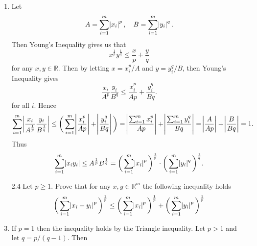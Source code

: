 \documentclass[12pt]{article}
\makeatletter
\theoremstyle{definition}
\theoremstyle{remark}
\renewenvironment{proof}[1][\proofname]{\par
  \pushQED{\qed}%
  \normalfont \topsep6\p@\@plus6\p@\relax
  \list{}{\leftmargin=0mm
          \rightmargin=4mm
          \settowidth{\itemindent}{\itshape#1}%
          \labelwidth=\itemindent
          \parsep=0pt \listparindent=\parindent 
  }
  \item[\hskip\labelsep
        \itshape
    #1\@addpunct{.}]\ignorespaces
}{%
  \popQED\endlist\@endpefalse
}
\let\oldproofname=\proofname
\renewcommand{\proofname}{\bf{\textit{\oldproofname}}}
\makeatother
\begin{document}
\begin{enumerate}[leftmargin=*]
            \begin{proof}
                Let 
                    \begin{equation*}
                        A=\sum_{i=1}^m\abs{x_i}^p,\quad B=\sum_{i=1}^m\abs{y_i}^q.
                    \end{equation*}
                Then Young's Inequality gives us that 
                    \begin{equation*}
                        x^{\frac{1}{p}}y^{\frac{1}{q}}\leq\frac{x}{p}+\frac{y}{q}
                    \end{equation*}
                for any $x,y\in\mathbb{R}$. Then by letting $x=x_i^p/A$ and $y=y_i^q/B$, then Young's Inequality gives 
                    \begin{equation*}
                        \frac{x_i}{A^p}\frac{y_i}{B^q}\leq \frac{x_i^p}{Ap}+\frac{y_i^q}{Bq}.
                    \end{equation*}
                for all $i$. Hence 
                    \begin{equation*}
                        \begin{split}
                            \sum_{i=1}^{m}\abs{\frac{x_i}{A^{\frac{1}{p}}}\frac{y_i}{B^{\frac{1}{q}}}}\leq \bigg(\sum_{i=1}^{m}\abs{\frac{x_i^p}{Ap}}+\abs{\frac{y_i^q}{Bq}}\bigg)=\abs{\frac{\sum_{i=1}^{m}x_i^p}{Ap}}+\abs{\frac{\sum_{i=1}^{m}y_i^q}{Bq}}=\abs{\frac{A}{Ap}}+\abs{\frac{B}{Bq}}=1.
                        \end{split}
                    \end{equation*}
                Thus 
                    \begin{equation*}
                        \sum_{i=1}^{m}\abs{x_iy_i}\leq A^{\frac{1}{p}}B^{\frac{1}{q}}=\bigg(\sum_{i=1}^{m}\abs{x_i}^p\bigg)^{\frac{1}{p}}\cdot\bigg(\sum_{i=1}^{m}\abs{y_i}^q\bigg)^{\frac{1}{q}}.
                    \end{equation*}
            \end{proof}
        \item[2.4] Let $p\geq 1$. Prove that for any $x,y\in\mathbb{R}^m$ the following inequality holds
            \begin{equation*}
                \bigg(\sum_{i=1}^m\abs{x_i+y_i}^p\bigg)^{\frac{1}{p}}\leq \bigg(\sum_{i=1}^m\abs{x_i}^p\bigg)^{\frac{1}{p}}+\bigg(\sum_{i=1}^m\abs{y_i}^p\bigg)^\frac{1}{p}
            \end{equation*}
            \begin{proof}
                If $p=1$ then the inequality holds by the Triangle inequality. Let $p>1$ and let $q=p/(q-1)$. Then 

\end{proof}
\end{enumerate}
\end{document}

